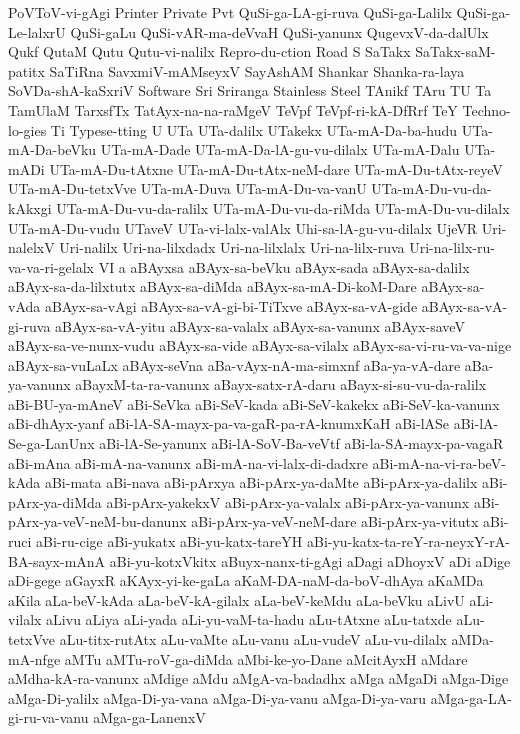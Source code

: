 {PoVToV-vi-gAgi
Printer
Private
Pvt
QuSi-ga-LA-gi-ruva
QuSi-ga-Lalilx
QuSi-ga-Le-lalxrU
QuSi-gaLu
QuSi-vAR-ma-deVvaH
QuSi-yanunx
QugevxV-da-dalUlx
Qukf
QutaM
Qutu
Qutu-vi-nalilx
Repro-du-ction
Road
S
SaTakx
SaTakx-saM-patitx
SaTiRna
SavxmiV-mAMseyxV
SayAshAM
Shankar
Shanka-ra-laya
SoVDa-shA-kaSxriV
Software
Sri
Sriranga
Stainless
Steel
TAnikf
TAru
TU
Ta
TamUlaM
TarxsfTx
TatAyx-na-na-raMgeV
TeVpf
TeVpf-ri-kA-DfRrf
TeY
Techno-lo-gies
Ti
Typese-tting
U
UTa
UTa-dalilx
UTakekx
UTa-mA-Da-ba-hudu
UTa-mA-Da-beVku
UTa-mA-Dade
UTa-mA-Da-lA-gu-vu-dilalx
UTa-mA-Dalu
UTa-mADi
UTa-mA-Du-tAtxne
UTa-mA-Du-tAtx-neM-dare
UTa-mA-Du-tAtx-reyeV
UTa-mA-Du-tetxVve
UTa-mA-Duva
UTa-mA-Du-va-vanU
UTa-mA-Du-vu-da-kAkxgi
UTa-mA-Du-vu-da-ralilx
UTa-mA-Du-vu-da-riMda
UTa-mA-Du-vu-dilalx
UTa-mA-Du-vudu
UTaveV
UTa-vi-lalx-valAlx
Uhi-sa-lA-gu-vu-dilalx
UjeVR
Uri-nalelxV
Uri-nalilx
Uri-na-lilxdadx
Uri-na-lilxlalx
Uri-na-lilx-ruva
Uri-na-lilx-ru-va-va-ri-gelalx
VI
a
aBAyxsa
aBAyx-sa-beVku
aBAyx-sada
aBAyx-sa-dalilx
aBAyx-sa-da-lilxtutx
aBAyx-sa-diMda
aBAyx-sa-mA-Di-koM-Dare
aBAyx-sa-vAda
aBAyx-sa-vAgi
aBAyx-sa-vA-gi-bi-TiTxve
aBAyx-sa-vA-gide
aBAyx-sa-vA-gi-ruva
aBAyx-sa-vA-yitu
aBAyx-sa-valalx
aBAyx-sa-vanunx
aBAyx-saveV
aBAyx-sa-ve-nunx-vudu
aBAyx-sa-vide
aBAyx-sa-vilalx
aBAyx-sa-vi-ru-va-va-nige
aBAyx-sa-vuLaLx
aBAyx-seVna
aBa-vAyx-nA-ma-simxnf
aBa-ya-vA-dare
aBa-ya-vanunx
aBayxM-ta-ra-vanunx
aBayx-satx-rA-daru
aBayx-si-su-vu-da-ralilx
aBi-BU-ya-mAneV
aBi-SeVka
aBi-SeV-kada
aBi-SeV-kakekx
aBi-SeV-ka-vanunx
aBi-dhAyx-yanf
aBi-lA-SA-mayx-pa-va-gaR-pa-rA-knumxKaH
aBi-lASe
aBi-lA-Se-ga-LanUnx
aBi-lA-Se-yanunx
aBi-lA-SoV-Ba-veVtf
aBi-la-SA-mayx-pa-vagaR
aBi-mAna
aBi-mA-na-vanunx
aBi-mA-na-vi-lalx-di-dadxre
aBi-mA-na-vi-ra-beV-kAda
aBi-mata
aBi-nava
aBi-pArxya
aBi-pArx-ya-daMte
aBi-pArx-ya-dalilx
aBi-pArx-ya-diMda
aBi-pArx-yakekxV
aBi-pArx-ya-valalx
aBi-pArx-ya-vanunx
aBi-pArx-ya-veV-neM-bu-danunx
aBi-pArx-ya-veV-neM-dare
aBi-pArx-ya-vitutx
aBi-ruci
aBi-ru-cige
aBi-yukatx
aBi-yu-katx-tareYH
aBi-yu-katx-ta-reY-ra-neyxY-rA-BA-sayx-mAnA
aBi-yu-kotxVkitx
aBuyx-nanx-ti-gAgi
aDagi
aDhoyxV
aDi
aDige
aDi-gege
aGayxR
aKAyx-yi-ke-gaLa
aKaM-DA-naM-da-boV-dhAya
aKaMDa
aKila
aLa-beV-kAda
aLa-beV-kA-gilalx
aLa-beV-keMdu
aLa-beVku
aLivU
aLi-vilalx
aLivu
aLiya
aLi-yada
aLi-yu-vaM-ta-hadu
aLu-tAtxne
aLu-tatxde
aLu-tetxVve
aLu-titx-rutAtx
aLu-vaMte
aLu-vanu
aLu-vudeV
aLu-vu-dilalx
aMDa-mA-nfge
aMTu
aMTu-roV-ga-diMda
aMbi-ke-yo-Dane
aMcitAyxH
aMdare
aMdha-kA-ra-vanunx
aMdige
aMdu
aMgA-va-badadhx
aMga
aMgaDi
aMga-Dige
aMga-Di-yalilx
aMga-Di-ya-vana
aMga-Di-ya-vanu
aMga-Di-ya-varu
aMga-ga-LA-gi-ru-va-vanu
aMga-ga-LanenxV
}
